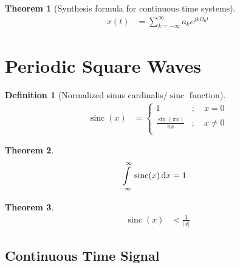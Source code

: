 \documentclass[titlepage, fleqn, a4paper, 12pt, twoside]{article}
\theoremstyle{definition}
\newtheorem{definition}{Definition}
\theoremstyle{theorem}
\newtheorem{theorem}{Theorem}
\DeclareMathOperator{\sinc}{sinc}
\begin{document}
\begin{theorem}[Synthesis formula for continuous time systems]
	\begin{align*}
		x(t) &= \sum\limits_{k = -\infty}^{\infty} a_k e^{j k \Omega_0 t}
	\end{align*}
	\label{thm:Synthesis_formula_for_continuous_time_systems}
\end{theorem}

\section{Periodic Square Waves}

\begin{definition}[Normalized sinus cardinalis/$\sinc$ function]
	\begin{align*}
		\sinc(x) &=
			\begin{cases}
				1 &;\quad x = 0\\
				\frac{\sin(\pi x)}{\pi x} &;\quad x\neq 0\\
			\end{cases}
	\end{align*}
\end{definition}

\begin{theorem}
	\begin{align*}
		\int\limits_{-\infty}^{\infty} \sinc(x) \dif x &= 1
	\end{align*}
\end{theorem}

\begin{theorem}
	\begin{align*}
		\sinc(x) &< \frac{1}{|x|}
	\end{align*}
\end{theorem}

\subsection{Continuous Time Signal}
\end{document}
